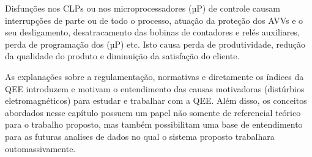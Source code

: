 Disfunções nos CLPs ou nos microprocessadores (µP) de controle causam interrupções de parte ou de todo o processo, atuação da proteção dos AVVs e o seu desligamento, desatracamento das bobinas de contadores e relés auxiliares, perda de programação dos (µP) etc. Isto causa perda de produtividade, redução da qualidade do produto e diminuição da satisfação do cliente.
\par 
As explanações sobre a regulamentação, normativas e diretamente os índices da QEE introduzem e motivam o entendimento das causas motivadoras (distúrbios eletromagnéticos) para estudar e trabalhar com a QEE. Além disso, os conceitos abordados nesse capítulo possuem um papel não somente de referencial teórico para o trabalho proposto, mas também possibilitam uma base de entendimento para as futuras analises de dados no qual o sistema proposto trabalhara outomassivamente.